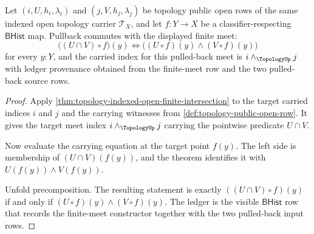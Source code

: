 \begin{theorem}
\label{thm:topology-pullback-open-row-finite-meet}
Let $(i,U,h_i,\lambda_i)$ and $(j,V,h_j,\lambda_j)$ be topology public open rows of the same indexed open topology carrier $\mathcal{T}_X$, and let $f:Y\to X$ be a classifier-respecting $\mathsf{BHist}$ map. Pullback commutes with the displayed finite meet:
$$
\bigl((U\cap V)\circ f\bigr)(y)
\Longleftrightarrow
\bigl((U\circ f)(y)\wedge(V\circ f)(y)\bigr)
$$
for every $y:Y$, and the carried index for this pulled-back meet is $i\wedge_{\TopologyUp}j$ with ledger provenance obtained from the finite-meet row and the two pulled-back source rows.
\end{theorem}
\begin{proof}
Apply \autoref{thm:topology-indexed-open-finite-intersection} to the target carried indices $i$ and $j$ and the carrying witnesses from \autoref{def:topology-public-open-row}. It gives the target meet index $i\wedge_{\TopologyUp}j$ carrying the pointwise predicate $U\cap V$.

Now evaluate the carrying equation at the target point $f(y)$. The left side is membership of $(U\cap V)(f(y))$, and the theorem identifies it with $U(f(y))\wedge V(f(y))$.

Unfold precomposition. The resulting statement is exactly $((U\cap V)\circ f)(y)$ if and only if $(U\circ f)(y)\wedge(V\circ f)(y)$. The ledger is the visible $\mathsf{BHist}$ row that records the finite-meet constructor together with the two pulled-back input rows.
\end{proof}

